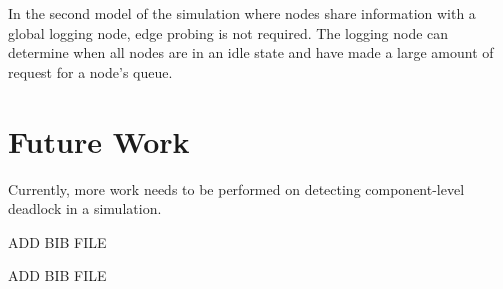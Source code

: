 \documentclass{article}
\begin{document}
In the second model of the simulation where nodes share information with a global logging node, edge probing is not required. The logging node can determine when all nodes are in an idle state and have made a large amount of request for a node's queue.

\section{Future Work}
Currently, more work needs to be performed on detecting component-level deadlock in a simulation.

\begin{thebibliography}{9}
ADD BIB FILE


ADD BIB FILE
\end{thebibliography}
\end{document}
